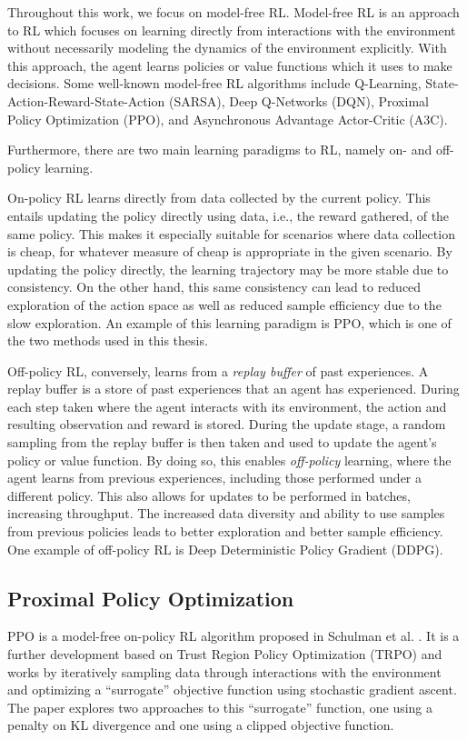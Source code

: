 Throughout this work, we focus on model-free RL.
Model-free RL is an approach to RL which focuses on learning directly from interactions with the environment without necessarily modeling the dynamics of the environment explicitly.
With this approach, the agent learns policies or value functions which it uses to make decisions.
Some well-known model-free RL algorithms include Q-Learning, State-Action-Reward-State-Action (SARSA), Deep Q-Networks (DQN), Proximal Policy Optimization (PPO), and Asynchronous Advantage Actor-Critic (A3C).

Furthermore, there are two main learning paradigms to RL, namely on- and off-policy learning.

On-policy RL learns directly from data collected by the current policy.
This entails updating the policy directly using data, i.e., the reward gathered, of the same policy.
This makes it especially suitable for scenarios where data collection is cheap, for whatever measure of cheap is appropriate in the given scenario.
By updating the policy directly, the learning trajectory may be more stable due to consistency.
On the other hand, this same consistency can lead to reduced exploration of the action space as well as reduced sample efficiency due to the slow exploration.
An example of this learning paradigm is PPO, which is one of the two methods used in this thesis.

Off-policy RL, conversely, learns from a \textit{replay buffer} of past experiences.
A replay buffer is a store of past experiences that an agent has experienced.
During each step taken where the agent interacts with its environment, the action and resulting observation and reward is stored.
During the update stage, a random sampling from the replay buffer is then taken and used to update the agent's policy or value function.
By doing so, this enables \textit{off-policy} learning, where the agent learns from previous experiences, including those performed under a different policy.
This also allows for updates to be performed in batches, increasing throughput.
The increased data diversity and ability to use samples from previous policies leads to better exploration and better sample efficiency.
One example of off-policy RL is Deep Deterministic Policy Gradient (DDPG).

\subsection{Proximal Policy Optimization}

PPO is a model-free on-policy RL algorithm proposed in Schulman et al. \cite{schulman2017proximal}.
It is a further development based on Trust Region Policy Optimization (TRPO) \cite{schulman2017trust} and works by iteratively sampling data through interactions with the environment and optimizing a ``surrogate'' objective function using stochastic gradient ascent. The paper explores two approaches to this ``surrogate'' function, one using a penalty on KL divergence and one using a clipped objective function.

